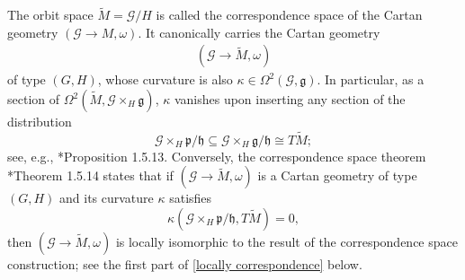 \documentclass[11pt]{amsart}
\begin{document}
The orbit space $\tilde M=\mathcal G/H$ is called the correspondence space of the Cartan geometry $(\mathcal G\to M,\omega)$. It canonically carries the Cartan geometry 
\begin{align*}
    (\mathcal G\to\tilde M,\omega)
\end{align*}
of type $(G,H)$, whose curvature is also $\kappa\in\Omega^2(\mathcal G,\mathfrak g)$. In particular, as a section of $\Omega^2(\tilde M,\mathcal G\times_H\mathfrak g)$, $\kappa$ vanishes upon inserting any section of the distribution
\[\mathcal G\times_H\mathfrak p/\mathfrak h\subseteq \mathcal G\times_H\mathfrak g/\mathfrak h \cong T\tilde M;\]
see, e.g., \cite{Book}*{Proposition 1.5.13}. Conversely, the correspondence space theorem \cite{Book}*{Theorem 1.5.14} states that if $(\mathcal G\to\tilde M,\omega)$ is a Cartan geometry of type $(G,H)$ and its curvature $\kappa$ satisfies
\[\kappa(\mathcal G\times_H\mathfrak p/\mathfrak h,T\tilde M)=0,\]
then $(\mathcal G\to\tilde M,\omega)$ is locally isomorphic to the result of the correspondence space construction; see the first part of \cref{locally correspondence} below.
\end{document}
